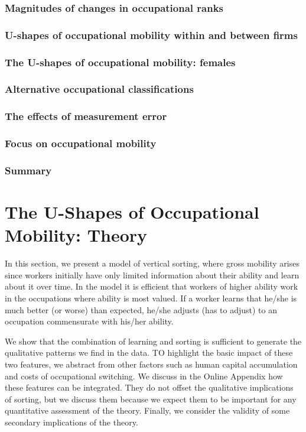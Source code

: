 \documentclass[12pt]{article}
\theoremstyle{definition}
\begin{document}
\subsubsection{Magnitudes of changes in occupational ranks}

\subsubsection{U-shapes of occupational mobility within and between firms}

\subsubsection{The U-shapes of occupational mobility: females}

\subsubsection{Alternative occupational classifications}

\subsubsection{The effects of measurement error}

\subsubsection{Focus on occupational mobility}

\subsubsection{Summary}

\section{The U-Shapes of Occupational Mobility: Theory}

In this section, we present a model of vertical sorting, where gross mobility arises since workers initially have only limited information about their ability and learn about it over time. In the model it is efficient that workers of higher ability work in the occupations where ability is most valued. If a worker learns that he/she is much better (or worse) than expected, he/she adjusts (has to adjust) to an occupation commensurate with his/her ability.

We show that the combination of learning and sorting is sufficient to generate the qualitative patterns we find in the data. TO highlight the basic impact of these two features, we abstract from other factors such as human capital accumulation and costs of occupational switching. We discuss in the Online Appendix how these features can be integrated. They do not offset the qualitative implications of sorting, but we discuss them because we expect them to be important for any quantitative assessment of the theory. Finally, we consider the validity of some secondary implications of the theory.
\end{document}
